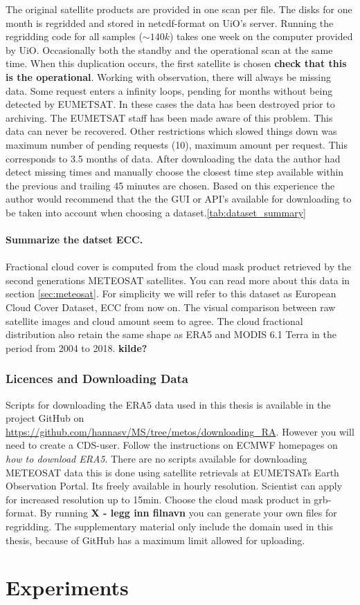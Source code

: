 The original satellite products are provided in one scan per file. The disks for one month is regridded and stored in \acrshort{netcdf}-format on UiO's server. Running the regridding code for all samples ($\sim 140k$) takes one week on the computer provided by UiO. Occasionally both the standby and the operational scan at the same time. When this duplication occurs, the first satellite is chosen \textbf{check that this is the operational}. Working with observation, there will always be missing data. Some request enters a infinity loops, pending for months without being detected by EUMETSAT. In these cases the data has been destroyed prior to archiving. The EUMETSAT staff has been made aware of this problem. This data can never be recovered. Other restrictions which slowed things down was maximum number of pending requests (10), maximum amount per request. This corresponds to 3.5 months of data. After downloading the data the author had detect missing times and manually choose the closest time step available within the previous and trailing 45 minutes are chosen. Based on this experience the author would recommend that the the GUI or API's available for downloading to be taken into account when choosing a dataset.\ref{tab:dataset_summary} \\ \\
\textbf{Summarize the datset ECC.}
\\ \\
Fractional cloud cover is computed from the cloud mask product retrieved by the second generations METEOSAT satellites. You can read more about this data in section \ref{sec:meteosat}. For simplicity we will refer to this dataset as European Cloud Cover Dataset, ECC from now on. The visual comparison between raw satellite images and cloud amount seem to agree. The cloud fractional distribution also retain the same shape as ERA5 and MODIS 6.1 Terra in the period from 2004 to 2018. \textbf{kilde?}

\subsubsection{Licences and Downloading Data} \label{sec:downloading_data}
Scripts for downloading the ERA5 data used in this thesis is available in the project GitHub on \href{https://github.com/hannasv/MS/tree/metos/downloading{\_}RA}{https://github.com/hannasv/MS/tree/metos/downloading{\_}RA}. However you will need to create a CDS-user. Follow the instructions on ECMWF homepages on \textit{how to download ERA5}. There are no scripts available for downloading METEOSAT data this is done using satellite retrievals at EUMETSATs Earth Observation Portal. Its freely available in hourly resolution. Scientist can apply for increased resolution up to 15min. Choose the cloud mask product in grb-format. By running \textbf{X - legg inn filnavn} you can generate your own files for regridding. The supplementary material only include the domain used in this thesis, because of GitHub has a maximum limit allowed for uploading. 

\section{Experiments}






